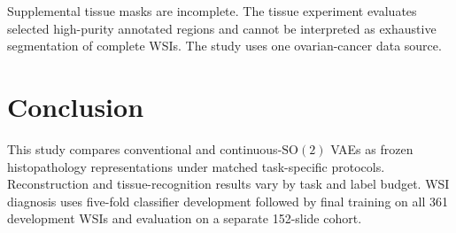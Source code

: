 \documentclass{midl}
\newcommand{\SOtwo}{\mathrm{SO}(2)}
\begin{document}
Supplemental tissue masks are incomplete. The tissue experiment evaluates selected high-purity annotated regions and cannot be interpreted as exhaustive segmentation of complete WSIs. The study uses one ovarian-cancer data source.

\section{Conclusion}

This study compares conventional and continuous-$\SOtwo$ VAEs as frozen histopathology representations under matched task-specific protocols. Reconstruction and tissue-recognition results vary by task and label budget. WSI diagnosis uses five-fold classifier development followed by final training on all 361 development WSIs and evaluation on a separate 152-slide cohort.

\clearpage

\end{document}
